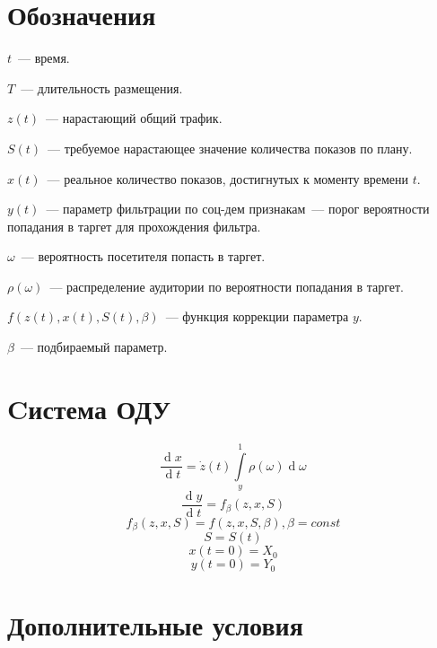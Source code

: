 \documentclass[fleqn]{article}
\renewcommand{\d}[1]{\ensuremath{\operatorname{d}\!{#1}}}
\begin{document}
\setlength\parindent{0pt}


\section{Обозначения}

$t$~--- время.

$T$~--- длительность размещения.

$z(t)$~--- нарастающий общий трафик.

$S(t)$~--- требуемое нарастающее значение количества показов по плану.

$x(t)$~--- реальное количество показов, достигнутых к моменту времени $t$.

$y(t)$~--- параметр фильтрации по соц-дем признакам~--- порог вероятности попадания в таргет для прохождения фильтра.

$\omega$~--- вероятность посетителя попасть в таргет.

$\rho(\omega)$~--- распределение аудитории по вероятности попадания в таргет.

$f(z(t), x(t), S(t), \beta)$~--- функция коррекции параметра $y$.

$\beta$~--- подбираемый параметр.


\section{Cистема ОДУ}

\begin{equation*}
  \frac{\d{x}}{\d{t}} = \dot{z}(t) \int\limits_y^1 \rho(\omega)\d{\omega}
\end{equation*}
\begin{equation*}
  \frac{\d{y}}{\d{t}} = f_\beta(z, x, S)
\end{equation*}
\begin{equation*}
  f_\beta(z, x, S) = f(z, x, S, \beta), \beta = const
\end{equation*}
\begin{equation*}
  S = S(t)
\end{equation*}
\begin{equation*}
  x(t = 0) = X_0
\end{equation*}
\begin{equation*}
  y(t = 0) = Y_0
\end{equation*}


\section{Дополнительные условия}
\end{document}

